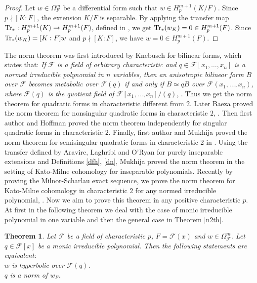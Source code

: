 \documentclass[times,10pt]{amsart}
\newcommand{\F}{\ensuremath{\mathcal{F}}}
\renewcommand{\cong}{\simeq}
\newtheorem{thm}{Theorem}[section]
\begin{document}
          \begin{proof}
           Let $w\in \Omega_F^m$  be  a differential form such that $ w\in H_p^{m+1}(K/F)$.  Since $p\nmid [K:F]$, the extension $K/F$ is separable.   By applying the transfer map ${\rm Tr}_*: H_p^{m+1}(K)\xrightarrow{} H_p^{m+1}(F)$, defined in \cite[Section 2]{AAB}, we get $ {\rm Tr}_*(w_K)=0\in H_p^{m+1}(F)$.  Since $ {\rm Tr}_*(w_K)= [K:F] w$ and $p\nmid [K:F]$, we have $w=0\in H_p^{m+1}(F)$.
          \end{proof} The norm theorem  was first introduced by Knebusch for bilinear forms, which states that: \textit{If $\F$ is a field of arbitrary characteristic and $q\in \F[x_1,\ldots,x_n]$ is a normed  irreducible polynomial in $n$ variables, then an anisotropic bilinear form $B$ over $\F$ becomes  metabolic over $\F(q)$ if and only if $ B\cong qB$ over $\F(x_1,\ldots,x_n)$, where $\F(q)$ is the quotient field of $\F[x_1,\ldots,x_n]/(q)$}, \cite[Theorem 4.2]{Knebusch}. Thus we get the norm theorem for quadratic forms in characteristic different from $2$. Later Baeza    proved  the norm theorem for nonsingular quadratic forms in characteristic $2$, \cite{Baeza}.   Then first author \cite{Laghribi1} and Hoffman \cite{Hoffmann1}  proved the  norm theorem  independently for singular quadratic forms in characteristic $2$.  Finally,    first author and Mukhija proved  the   norm theorem for  semisingular quadratic forms in characteristic $2$ in \cite{LM}.  Using the transfer defined by Aravire, Laghribi and O'Ryan for purely inseparable extensions and Definitions \ref{dfh}, \ref{dn}, Mukhija \cite[Theorem A.3]{Appendix} proved the norm theorem in the setting of Kato-Milne cohomology for  inseparable polynomials. Recently by proving the Milnor-Scharlau exact sequence,  we prove  the norm theorem for Kato-Milne cohomology in characteristic $2$ for any normed irreducible polynomial, \cite[Theorem 5.8]{ex}. Now we aim to prove this theorem in any positive characteristic $p$.      At first in the following theorem we deal with the case of  monic irreducible polynomial in one variable  and then the general case in Theorem \ref{n2th}. 
            \begin{thm}\label{thno} Let $\F$ be a field of characteristic $p$, $F=\F(x)$ and $ w\in \Omega_{\F}^m$. Let $q\in \F[x]$ be a monic irreducible polynomial. Then the following statements are equivalent:\\
            $w$ is hyperbolic over $\F(q)$.\\
           $q$ is a norm of $w_F$. 
           \end{thm}
\end{document}
